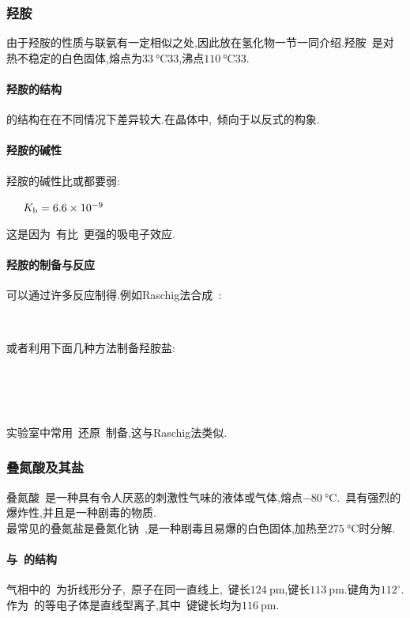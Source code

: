 \documentclass{ctexbook}
\begin{document}
\subsubsection{羟胺~}
由于羟胺的性质与联氨有一定相似之处,因此放在氢化物一节一同介绍.羟胺~是对热不稳定的白色固体,熔点为$\SI{33}{\celsius}33$,沸点$\SI{110}{\celsius}33$.
\paragraph{羟胺的结构}
的结构在在不同情况下差异较大.在晶体中,~倾向于以反式的构象.
\paragraph{羟胺的碱性}
羟胺的碱性比或都要弱:
\begin{tightcenter}
    \ \ \ $K_\text b=6.6\times10^{-9}$
\end{tightcenter}
这是因为~有比~更强的吸电子效应.
\paragraph{羟胺的制备与反应}
可以通过许多反应制得.例如Raschig法合成~:
\begin{tightcenter}
    \\
\end{tightcenter}
或者利用下面几种方法制备羟胺盐:
\begin{tightcenter}
     \\
    \\
    \ \ \ \ \ 
\end{tightcenter}
实验室中常用~还原~制备,这与Raschig法类似.
\subsubsection{叠氮酸及其盐}
叠氮酸~是一种具有令人厌恶的刺激性气味的液体或气体,熔点$\SI{-80}{\celsius}$.~具有强烈的爆炸性,并且是一种剧毒的物质.\\
\indent 最常见的叠氮盐是叠氮化钠~,是一种剧毒且易爆的白色固体,加热至$\SI{275}{\celsius}$时分解.
\paragraph{与~的结构}
气相中的~为折线形分子,~原子在同一直线上,~键长$\SI{124}{\pico\meter}$,键长$\SI{113}{\pico\meter}$.键角为$112^\circ$.\\
\indent {}作为~的等电子体是直线型离子,其中~键键长均为$\SI{116}{\pico\meter}$.
\end{document}
